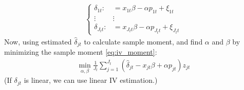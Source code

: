 \documentclass[11pt]{elegantbook}
\begin{document}
\begin{definition}
\begin{enumerate}
        \begin{equation}
            \begin{aligned}
                \left\{\begin{matrix}
                    \delta_{1t}:&=x_{1t}\beta-\alpha p_{1t}+\xi_{1t}\\
                    \vdots&\vdots\\
                    \delta_{J_tt}:&=x_{J_tt}\beta-\alpha p_{J_tt}+\xi_{J_tt}
                \end{matrix}\right.
            \end{aligned}
            \nonumber
        \end{equation}
        Now, using estimated $\hat{\delta}_{jt}$ to calculate sample moment, and find $\alpha$ and $\beta$ by minimizing the sample moment \eqref{eq:iv_moment}:
        \begin{equation}
            \begin{aligned}
                \min_{\alpha,\beta}\frac{1}{J_t}\sum_{j=1}^{J_t}\left(\hat{\delta}_{jt}-x_{jt}\beta+\alpha p_{jt}\right)z_{jt}
            \end{aligned}
            \nonumber
        \end{equation}
        (If $\delta_{jt}$ is linear, we can use linear IV estimation.)
    \end{enumerate}
\end{definition}
\end{document}

